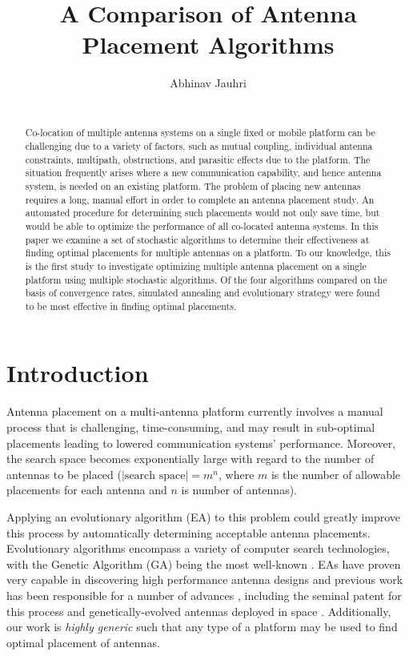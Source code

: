 \documentclass{sig-alternate}
\title{A Comparison of Antenna Placement Algorithms}
\author{\alignauthor
    Abhinav Jauhri\\
    \affaddr{Carnegie Mellon University}\\
\email{ajauhri@cmu.edu}}
\begin{document}
\maketitle
\begin{abstract}
Co-location of multiple antenna systems on a single fixed or mobile platform can be challenging due to a variety of factors, such as mutual coupling, individual antenna constraints, multipath, obstructions, and parasitic effects due to the platform. The situation frequently arises where a new communication capability, and hence antenna system, is needed on an existing platform. The problem of placing new antennas requires a long, manual effort in order to complete an antenna placement study. An automated procedure for determining such placements would not only save time, but would be able to optimize the performance of all co-located antenna systems. In this paper we examine a set of stochastic algorithms to determine their effectiveness at finding optimal placements for multiple antennas on a platform. To our knowledge, this is the first study to investigate optimizing multiple antenna placement on a single platform using multiple stochastic algorithms. Of the four algorithms compared on the basis of convergence rates, simulated annealing and evolutionary strategy were found to be most effective in finding optimal placements.
\end{abstract}

\section{Introduction}
Antenna placement on a multi-antenna platform currently involves a manual process that is challenging, time-consuming, and may result in sub-optimal placements leading to lowered communication systems' performance. Moreover, the search space becomes exponentially large with regard to the number of antennas to be placed ($|\text{search space}| = m^n$, where $m$ is the number of allowable placements for each antenna and $n$ is number of antennas). 

Applying an evolutionary algorithm (EA) to this problem could greatly improve this process by automatically determining acceptable antenna placements.  Evolutionary algorithms encompass a variety of computer search technologies, with the Genetic Algorithm (GA) being the most well-known \cite{holland1975adaptation}. EAs have proven very capable in discovering high performance antenna designs and previous work has been responsible for a number of advances \cite{haupt2007genetic}, including the seminal patent for this process and genetically-evolved antennas deployed in space \cite{linden1997automated, lohn2005evolutionary}.  Additionally, our work is \textit{highly generic} such that any type of a platform may be used to find optimal placement of antennas.
\end{document}
